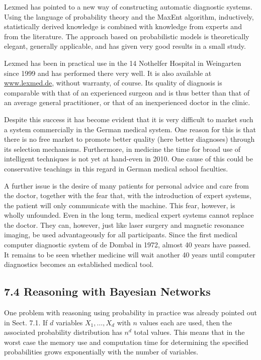 \documentclass[10pt]{book}
\begin{document}
\begin{center}
\begin{enumerate}
Lexmed has pointed to a new way of constructing automatic diagnostic systems. Using the language of probability theory and the MaxEnt algorithm, inductively,\\
statistically derived knowledge is combined with knowledge from experts and from the literature. The approach based on probabilistic models is theoretically elegant, generally applicable, and has given very good results in a small study.

Lexmed has been in practical use in the 14 Nothelfer Hospital in Weingarten since 1999 and has performed there very well. It is also available at \href{http://www.lexmed.de}{www.lexmed.de}, without warranty, of course. Its quality of diagnosis is comparable with that of an experienced surgeon and is thus better than that of an average general practitioner, or that of an inexperienced doctor in the clinic.

Despite this success it has become evident that it is very difficult to market such a system commercially in the German medical system. One reason for this is that there is no free market to promote better quality (here better diagnoses) through its selection mechanisms. Furthermore, in medicine the time for broad use of intelligent techniques is not yet at hand-even in 2010. One cause of this could be conservative teachings in this regard in German medical school faculties.

A further issue is the desire of many patients for personal advice and care from the doctor, together with the fear that, with the introduction of expert systems, the patient will only communicate with the machine. This fear, however, is wholly unfounded. Even in the long term, medical expert systems cannot replace the doctor. They can, however, just like laser surgery and magnetic resonance imaging, be used advantageously for all participants. Since the first medical computer diagnostic system of de Dombal in 1972, almost 40 years have passed. It remains to be seen whether medicine will wait another 40 years until computer diagnostics becomes an established medical tool.

\subsection*{7.4 Reasoning with Bayesian Networks}
One problem with reasoning using probability in practice was already pointed out in Sect. 7.1. If $d$ variables $X_{1}, \ldots, X_{d}$ with $n$ values each are used, then the associated probability distribution has $n^{d}$ total values. This means that in the worst case the memory use and computation time for determining the specified probabilities grows exponentially with the number of variables.


\end{enumerate}
\end{center}
\end{document}
